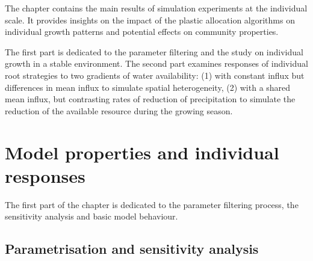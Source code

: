 
\begin{fullwidth}
The chapter contains the main results of simulation experiments at the individual scale. It provides insights on the impact of the plastic allocation algorithms on individual growth patterns and potential effects on community properties. 

The first part is dedicated to the parameter filtering and the study on individual growth in a stable environment. The second part examines responses of individual root strategies to two gradients of water availability: (1) with constant influx but differences in mean influx to simulate spatial heterogeneity, (2) with a shared mean influx, but contrasting rates of reduction of precipitation to simulate the reduction of the available resource during the growing season.
\end{fullwidth}

\chapter{Model properties and individual responses}


The first part of the chapter is dedicated to the parameter filtering process, the sensitivity analysis and basic model behaviour. %


\section{Parametrisation and sensitivity analysis} \label{section:calibration}

